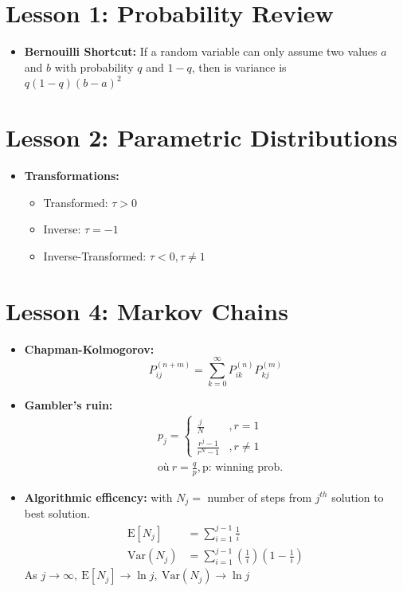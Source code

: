 \documentclass[10pt, french]{article}
\begin{document}
\small
\begin{multicols*}{3} %
\def\SectionColor{magenta!80!white}
\section*{Lesson 1: Probability Review}
\begin{itemize}[align=left,leftmargin=*]
    \item \textbf{Bernouilli Shortcut:} If a random variable can only assume two values $a$ and $b$ with probability $q$ and $1-q$, then is variance is \\ $q(1-q)(b-a)^2$
\end{itemize}

\section*{Lesson 2: Parametric Distributions}
\begin{itemize}[align=left,leftmargin=*]
    \item \textbf{Transformations:}
    \begin{itemize}
        \item Transformed: $\tau > 0$
        \item Inverse: $\tau = -1$
        \item Inverse-Transformed: $\tau < 0, \tau \neq 1$
    \end{itemize}
\end{itemize}

\def\SectionColor{brown!80!white}
\section*{Lesson 4: Markov Chains}
\begin{itemize}[align=left,leftmargin=*]
    \item \textbf{Chapman-Kolmogorov:} \[ P_{ij}^{(n+m)} = \sum_{k=0}^\infty P_{ik}^{(n)}  P_{kj}^{(m)} \]
    \item \textbf{Gambler's ruin:}
    \begin{align*}
        &p_j=
        \left\{
        \begin{array}{cc}
        \frac{j}{N} & ,r=1  \\
        \frac{r^j-1}{r^N-1} & ,r \neq 1
        \end{array}
        \right. \\
        & \text{où}\: r = \frac{q}{p}, \text{p: winning prob.}
    \end{align*}
    \item \textbf{Algorithmic efficency:} with $N_j=$ number of steps from $j^{th}$ solution to best solution.
    \begin{align*}
        \mathrm{E}[N_j] &= \sum_{i=1}^{j-1} \frac{1}{i} \\
        \text{Var}(N_j) &= \sum_{i=1}^{j-1} \left( \frac{1}{i} \right) \left(1 -  \frac{1}{i} \right)
    \end{align*}
    As $j \rightarrow \infty,\: \mathrm{E}[N_j] \rightarrow \ln j,\: \text{Var}(N_j) \rightarrow \ln j$
\end{itemize}


\end{multicols*}
\end{document}
